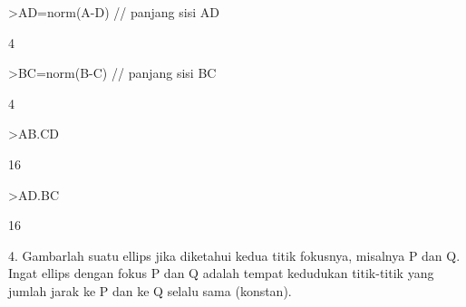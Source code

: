 \documentclass[12pt,Times new roman,letterpaper]{book}
\begin{document}
\begin{eulernootebook}
\begin{eulercomment}
\begin{eulercomment}
\begin{eulernootebook}
\begin{eulercomment}
\begin{eulercomment}
\begin{eulercomment}
\begin{eulercomment}
\begin{eulercomment}
\begin{eulercomment}
\begin{eulernotebook}
\begin{eulercomment}
\begin{eulercomment}
\begin{eulercomment}
\begin{eulercomment}
\begin{eulercomment}
\begin{eulerprompt}
>AD=norm(A-D) // panjang sisi AD
\end{eulerprompt}
\begin{euleroutput}
  4
\end{euleroutput}
\begin{eulerprompt}
>BC=norm(B-C) // panjang sisi BC
\end{eulerprompt}
\begin{euleroutput}
  4
\end{euleroutput}
\begin{eulerprompt}
>AB.CD
\end{eulerprompt}
\begin{euleroutput}
  16
\end{euleroutput}
\begin{eulerprompt}
>AD.BC
\end{eulerprompt}
\begin{euleroutput}
  16
\end{euleroutput}
\begin{eulercomment}
4. Gambarlah suatu ellips jika diketahui kedua titik fokusnya,
misalnya P dan Q. Ingat ellips dengan fokus P dan Q adalah tempat
kedudukan titik-titik yang jumlah jarak ke P dan ke Q selalu sama
(konstan).


\end{eulercomment}
\end{eulercomment}
\end{eulercomment}
\end{eulercomment}
\end{eulercomment}
\end{eulercomment}
\end{eulernotebook}
\end{eulercomment}
\end{eulercomment}
\end{eulercomment}
\end{eulercomment}
\end{eulercomment}
\end{eulercomment}
\end{eulernootebook}
\end{eulercomment}
\end{eulercomment}
\end{eulernootebook}
\end{document}
